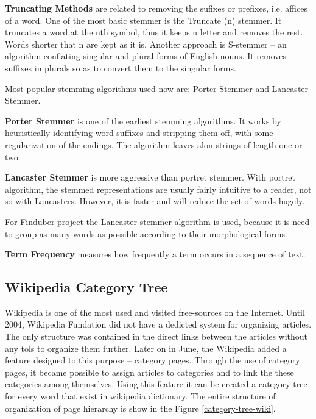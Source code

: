 \textbf{Truncating Methods} are related to removing the sufixes or prefixes, i.e. affices of a word. One of the most basic stemmer is the Truncate (n) stemmer. It truncates a word at the nth symbol, thus it keeps n letter and removes the rest. Words shorter that n are kept as it is. Another approach is S-stemmer -- an algorithm conflating singular and plural forms of English nouns. It removes suffixes in plurals so as to convert them to the singular forms. \cite{truncat-stemm}

Most popular stemming algorithms used now are: Porter Stemmer and Lancaster Stemmer.

\textbf{Porter Stemmer} is one of the earliest stemming algorithms. It works by heuristically identifying word suffixes and stripping them off, with some regularization of the endings. The algorithm leaves alon strings of length one or two. 

\textbf{Lancaster Stemmer} is more aggressive than portret stemmer. With portret algorithm, the stemmed representations are usualy fairly intuitive to a reader, not so with Lancasters. However, it is faster and will reduce the set of words hugely. 

For Finduber project the Lancaster stemmer algorithm is used, because it is need to group as many words as possible according to their morphological forms.

\textbf{Term Frequency} measures how frequently a term occurs in a sequence of text.

\subsection{Wikipedia Category Tree}

Wikipedia is one of the most used and visited free-sources on the Internet. Until 2004, Wikipedia Fundation did not have a dedicted system for organizing articles. The only structure was contained in the direct links between the articles without any tols to organize them further.\cite{wikicategory} Later on in June, the Wikipedia added a feature designed to this purpose -- category pages. Through the use of category pages, it became possible to assign articles to categories and to link the these categories among themselves. Using this feature it can be created a category tree for every word that exist in wikipedia dictionary. The entire structure of organization of page hierarchy is show in the Figure \ref{category-tree-wiki}. 

